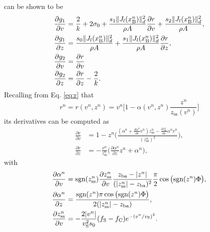 can be shown to be
\begin{align*}
    \frac{\partial g_1}{\partial v} &= \frac{2}{k} + 2\sigma_0 + \frac{s_1\lVert J_l(x_{\text{B}}^n)\rVert_d^2}{\rho A}\frac{\partial r}{\partial v}+\frac{s_2\lVert J_l(x_{\text{B}}^n)\rVert_d^2}{\rho A},\\
    \frac{\partial g_1}{\partial z} &= \frac{s_0\lVert J_l(x_{\text{B}}^n)\rVert_d^2}{\rho A} + \frac{s_1\lVert J_l(x_{\text{B}}^n)\rVert_d^2}{\rho A}\frac{\partial r}{\partial z},\\
    \frac{\partial g_2}{\partial v} &= \frac{\partial r}{\partial v}
    \\\frac{\partial g_2}{\partial z}&= \frac{\partial r}{\partial z} -\frac{2}{k}.
\end{align*}
Recalling from Eq. \eqref{eq:r} that
\begin{equation*}
    r^n = r(v^n,z^n) = v^n\bigg[1-\alpha(v^n,z^n)\frac{z^n}{z_\text{ss}(v^n)}\bigg]
\end{equation*}
its derivatives can be computed as
\begin{align*}
    \frac{\partial r}{\partial v} &= 1-z^n\Bigg(\frac{(\alpha^n+\frac{\partial \alpha^n}{\partial v}v^n)z_\text{ss}^n - \frac{\partial z_\text{ss}^n}{\partial v}\alpha^n v^n}{(z_\text{ss}^n)^2}\Bigg),\\
    \frac{\partial r}{\partial z} &= -\frac{v^n}{z_\text{ss}^n}\bigg(\frac{\partial \alpha^n}{\partial z}z^n + \alpha^n\bigg),
    \end{align*}
with
\begin{align*}
    \frac{\partial\alpha^n}{\partial v} &=\text{sgn}(z_\text{ss}^n)\frac{\partial z_\text{ss}^n}{\partial v}\frac{z_\text{ba} - |z^n|}{(|z_\text{ss}^n| - z_\text{ba})^2}\frac{\pi}{2}\cos\big(\text{sgn}(z^n)\Phi\big),\\
    \frac{\partial\alpha^n}{\partial z}&=\frac{\text{sgn}(z^n)\pi\cos\big(\text{sgn}(z^n)\Phi\big)}{2(|z_\text{ss}^n|-z_\text{ba})},\\
    \frac{\partial z_\text{ss}^n}{\partial v} &= -\frac{2|v^n|}{v_\text{S}^2 s_0}(f_\text{S}-f_\text{C})e^{-(v^n/v_\text{S})^2}.
\end{align*}
